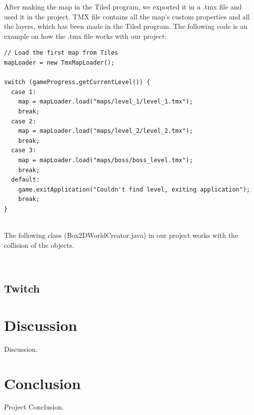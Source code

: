 \documentclass[12p]{article}
\begin{document}
After making the map in the Tiled program, we exported it in a .tmx file and used it in the project. TMX file contains all the map’s custom properties and all the layers, which has been made in the Tiled program. The following code is an example on how the .tmx file works with our project:

\begin{verbatim}
// Load the first map from Tiles
mapLoader = new TmxMapLoader();

switch (gameProgress.getCurrentLevel()) {
  case 1:
    map = mapLoader.load("maps/level_1/level_1.tmx");
    break;
  case 2:
    map = mapLoader.load("maps/level_2/level_2.tmx");
    break;
  case 3:
    map = mapLoader.load("maps/boss/boss_level.tmx");
    break;
  default:
    game.exitApplication("Couldn't find level, exiting application");
    break;
}


\end{verbatim}
The following class (Box2DWorldCreator.java) in our project works with the collision of the objects. 
\begin{verbatim}


\end{verbatim}

\subsection{Twitch} \label{Twitch}


\newpage
\section{Discussion}

Discussion.


\newpage
\section{Conclusion}

Project Conclusion.
\end{document}
